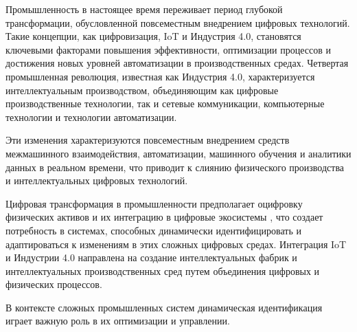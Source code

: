 \Introduction

Промышленность в настоящее время переживает период глубокой трансформации,
обусловленной повсеместным внедрением цифровых технологий. Такие концепции, как
цифровизация, IoT и
Индустрия
4.0, становятся ключевыми факторами повышения эффективности, оптимизации
процессов и достижения новых уровней автоматизации в производственных
средах.\cite{iotoverview}
Четвертая промышленная революция, известная как Индустрия 4.0, характеризуется
интеллектуальным
производством, объединяющим как цифровые производственные технологии, так и
сетевые
коммуникации, компьютерные технологии и технологии автоматизации.

Эти изменения характеризуются повсеместным внедрением средств межмашинного
взаимодействия, автоматизации, машинного обучения и аналитики данных в реальном
времени, что приводит к слиянию физического производства и интеллектуальных
цифровых технологий.

Цифровая трансформация в промышленности предполагает оцифровку физических
активов и их интеграцию в цифровые экосистемы \cite{iotoverview}, что создает
потребность в системах, способных динамически идентифицировать и адаптироваться
к изменениям в этих сложных цифровых средах. Интеграция IoT и Индустрии 4.0
направлена на создание интеллектуальных фабрик и интеллектуальных
производственных сред путем объединения цифровых и физических процессов.

В контексте сложных промышленных систем динамическая идентификация играет важную роль в их оптимизации и управлении.


